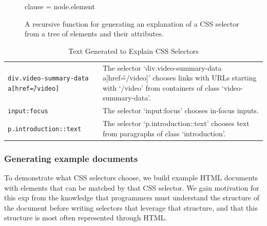 \begin{figure}
\begin{algorithmic}

        clause = node.element
    \Else{}
    \EndIf{}
    \EndIf{}
    \EndIf{}
\EndFunction{}

\end{algorithmic}
\caption{A recursive function for generating an explanation of a CSS selector from a tree of elements and their attributes.}
\label{alg:css_traversal}
\end{figure}


\begin{table}[t]
\caption{Text Generated to Explain CSS Selectors}
\label{tab:css_descriptions}
\centering
\begin{tabular}{ST}
\toprule
{} &  \\
\midrule
\texttt{div.video-summary-data a[href\^=/video]} & The selector `div.video-summary-data a[href\^=/video]' chooses links with URLs starting with `/video' from containers of class `video-summary-data'. \\ \midrule
\texttt{input:focus} & The selector `input:focus' chooses in-focus inputs. \\ \midrule
\texttt{p.introduction::text} & The selector `p.introduction::text' chooses text from paragraphs of class `introduction'. \\ \bottomrule
\end{tabular}
\end{table}

\subsubsection{Generating example documents}

To demonstrate what CSS selectors choose, we build example HTML documents with elements that can be matched by that CSS selector.
We gain motivation for this \gls{exp} from the knowledge that programmers must understand the structure of the document before writing selectors that leverage that structure, and that this structure is most often represented through HTML\@.


